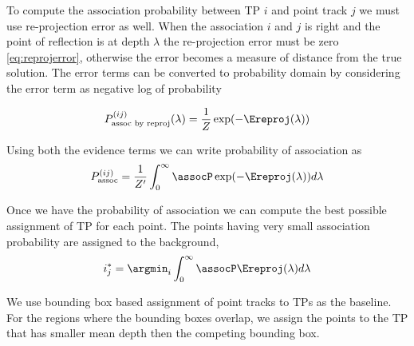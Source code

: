 To compute the association probability between TP $i$ and
point track $j$ we must use re-projection error as well. When the association
$i$ and $j$ is right and the point of reflection is at depth $\lambda$ the
re-projection error must be zero \eqref{eq:reprojerror}, otherwise the error
becomes a measure of distance from the true solution.
The error terms can be converted to probability domain by considering the error
term as negative log of probability

\begin{align}
  P^{(ij)}_{\text{assoc by reproj}}(\lambda) = \frac{1}{Z}\exp(-\Ereproj(\lambda))
\end{align}

Using both the evidence terms we can write probability of association as
\begin{align}
  P^{(ij)}_{\text{assoc}} = \frac{1}{Z'}\int_0^{\infty} \assocP \exp(-\Ereproj(\lambda))d\lambda
  \label{eq:prob-assoc}
\end{align}

Once we have the probability of association we can compute the best possible
assignment of TP for each point. The points having very small association
probability are assigned to the background,
\begin{align}
  i^*_{j} = \argmin_{i} \int_0^\infty \assocP \Ereproj(\lambda) d\lambda
\end{align}

We use bounding box based assignment of point tracks to TPs as the baseline.
For the regions where the bounding boxes overlap, we assign the points to the
TP that has smaller mean depth then the competing bounding box.


